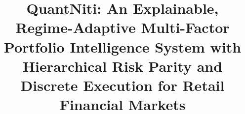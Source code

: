 \documentclass[conference]{IEEEtran}
\makeatletter
\newcommand{\linebreakand}{%
  \end{@IEEEauthorhalign}
  \hfill\mbox{}\par
  \vspace{0.7em}
  \mbox{}\hfill\begin{@IEEEauthorhalign}
}
\makeatother
\begin{document}
\title{QuantNiti: An Explainable, Regime-Adaptive Multi-Factor Portfolio Intelligence System with Hierarchical Risk Parity and Discrete Execution for Retail Financial Markets}

\newif\ifblindreview
\blindreviewtrue

\ifblindreview
\author{}
\else
\author{
\IEEEauthorblockN{Beena K.}
\IEEEauthorblockA{\textit{Department of Computer} \\
\textit{Science and Engineering} \\
\textit{K.S. Institute of Technology}\\
Bengaluru, Karnataka \\
{\small beenak@ksit\hspace{0.15em}.edu\hspace{0.15em}.in}}
\and
\IEEEauthorblockN{Jayaditya Dev}
\IEEEauthorblockA{\textit{Department of Computer} \\
\textit{Science and Engineering} \\
\textit{K.S. Institute of Technology}\\
Bengaluru, Karnataka \\
{\small jayadityadev\_cse@ksit\hspace{0.15em}.edu\hspace{0.15em}.in}}
\and
\IEEEauthorblockN{Durgashree M.}
\IEEEauthorblockA{\textit{Department of Computer} \\
\textit{Science and Engineering} \\
\textit{K.S. Institute of Technology}\\
Bengaluru, Karnataka \\
{\small durgashreem\_cse2023@ksit\hspace{0.15em}.edu\hspace{0.15em}.in}}
\linebreakand
\IEEEauthorblockN{Aryaman Tiwari}
\IEEEauthorblockA{\textit{Department of Computer} \\
\textit{Science and Engineering} \\
\textit{K.S. Institute of Technology}\\
Bengaluru, Karnataka \\
{\small aryamantiwari\_cse2023@ksit\hspace{0.15em}.edu\hspace{0.15em}.in}}
\and
\IEEEauthorblockN{Chirag T.}
\IEEEauthorblockA{\textit{Department of Computer} \\
\textit{Science and Engineering} \\
\textit{K.S. Institute of Technology}\\
Bengaluru, Karnataka \\
{\small chiragt\_cse2023@ksit\hspace{0.15em}.edu\hspace{0.15em}.in}}
}
\fi
\end{document}

